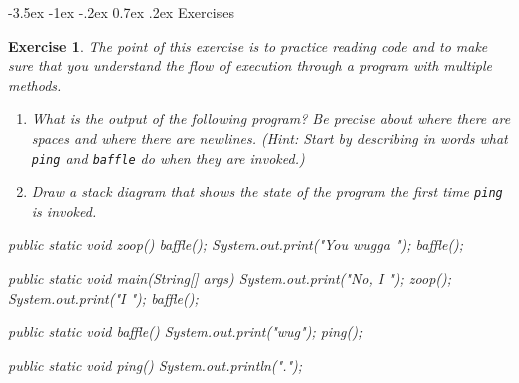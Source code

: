 \documentclass[12pt]{book}
\makeatletter
\theoremstyle{exercise}
\newtheorem{exercise}{Exercise}[chapter]
\newcommand{\java}[1]{\verb"#1"}
\renewcommand{\section}{\@startsection{section}{1}{\z@}%
    {-3.5ex \@plus -1ex \@minus -.2ex}%
    {0.7ex \@plus.2ex}%
    {\normalfont\Large\bfseries}}
\newcommand{\java}[1]{\lstinline{#1}} %
\makeatother
\begin{document}
\section{Exercises}


\begin{exercise}

The point of this exercise is to practice reading code and to make sure that you understand the flow of execution through a program with multiple methods.

\begin{enumerate}

\item What is the output of the following program?
Be precise about where there are spaces and where there are newlines.
(Hint: Start by describing in words what \java{ping} and \java{baffle} do when they are invoked.)

\item Draw a stack diagram that shows the state of the program the first time \java{ping} is invoked.


\end{enumerate}

\begin{code}
    public static void zoop() {
        baffle();
        System.out.print("You wugga ");
        baffle();
    }

    public static void main(String[] args) {
        System.out.print("No, I ");
        zoop();
        System.out.print("I ");
        baffle();
    }

    public static void baffle() {
        System.out.print("wug");
        ping();
    }

    public static void ping() {
        System.out.println(".");
    }
\end{code}

\end{exercise}
\end{document}
